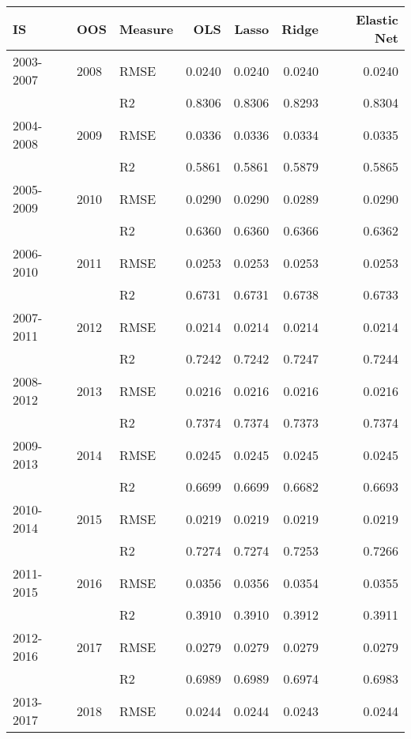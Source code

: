 \begin{tabular}{lllrrrr}
\toprule
        IS &   OOS & Measure &     OLS &   Lasso &   Ridge &  Elastic Net \\
\midrule
 2003-2007 &  2008 &    RMSE &  0.0240 &  0.0240 &  0.0240 &       0.0240 \\
           &       &      R2 &  0.8306 &  0.8306 &  0.8293 &       0.8304 \\
 2004-2008 &  2009 &    RMSE &  0.0336 &  0.0336 &  0.0334 &       0.0335 \\
           &       &      R2 &  0.5861 &  0.5861 &  0.5879 &       0.5865 \\
 2005-2009 &  2010 &    RMSE &  0.0290 &  0.0290 &  0.0289 &       0.0290 \\
           &       &      R2 &  0.6360 &  0.6360 &  0.6366 &       0.6362 \\
 2006-2010 &  2011 &    RMSE &  0.0253 &  0.0253 &  0.0253 &       0.0253 \\
           &       &      R2 &  0.6731 &  0.6731 &  0.6738 &       0.6733 \\
 2007-2011 &  2012 &    RMSE &  0.0214 &  0.0214 &  0.0214 &       0.0214 \\
           &       &      R2 &  0.7242 &  0.7242 &  0.7247 &       0.7244 \\
 2008-2012 &  2013 &    RMSE &  0.0216 &  0.0216 &  0.0216 &       0.0216 \\
           &       &      R2 &  0.7374 &  0.7374 &  0.7373 &       0.7374 \\
 2009-2013 &  2014 &    RMSE &  0.0245 &  0.0245 &  0.0245 &       0.0245 \\
           &       &      R2 &  0.6699 &  0.6699 &  0.6682 &       0.6693 \\
 2010-2014 &  2015 &    RMSE &  0.0219 &  0.0219 &  0.0219 &       0.0219 \\
           &       &      R2 &  0.7274 &  0.7274 &  0.7253 &       0.7266 \\
 2011-2015 &  2016 &    RMSE &  0.0356 &  0.0356 &  0.0354 &       0.0355 \\
           &       &      R2 &  0.3910 &  0.3910 &  0.3912 &       0.3911 \\
 2012-2016 &  2017 &    RMSE &  0.0279 &  0.0279 &  0.0279 &       0.0279 \\
           &       &      R2 &  0.6989 &  0.6989 &  0.6974 &       0.6983 \\
 2013-2017 &  2018 &    RMSE &  0.0244 &  0.0244 &  0.0243 &       0.0244 \\

\end{tabular}

